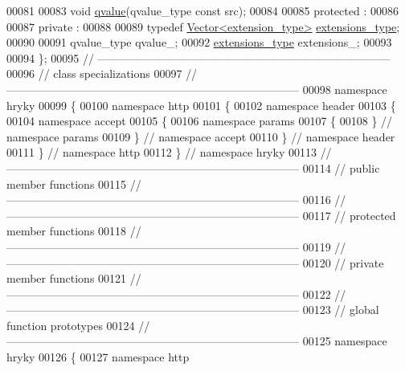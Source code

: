 \begin{DoxyCode}
00081 
00083     \textcolor{keywordtype}{void} \hyperlink{classhryky_1_1http_1_1header_1_1accept_1_1params_1_1_entity_a01141a7fae976c8a5ed5de55eb5d7349}{qvalue}(qvalue\_type \textcolor{keyword}{const} src);
00084 
00085 \textcolor{keyword}{protected} :
00086 
00087 \textcolor{keyword}{private} :
00088 
00089     \textcolor{keyword}{typedef} \hyperlink{classhryky_1_1_vector}{Vector<extension_type>} \hyperlink{classhryky_1_1_vector}{extensions_type};
00090 
00091     qvalue\_type qvalue\_;
00092     \hyperlink{classhryky_1_1_vector}{extensions_type} extensions\_;
00093 
00094 \};
00095 \textcolor{comment}{//
      ------------------------------------------------------------------------------}
00096 \textcolor{comment}{// class specializations}
00097 \textcolor{comment}{//
      ------------------------------------------------------------------------------}
00098 \textcolor{keyword}{namespace }hryky
00099 \{
00100 \textcolor{keyword}{namespace }http
00101 \{
00102 \textcolor{keyword}{namespace }header
00103 \{
00104 \textcolor{keyword}{namespace }accept
00105 \{
00106 \textcolor{keyword}{namespace }params
00107 \{
00108 \} \textcolor{comment}{// namespace params}
00109 \} \textcolor{comment}{// namespace accept}
00110 \} \textcolor{comment}{// namespace header}
00111 \} \textcolor{comment}{// namespace http}
00112 \} \textcolor{comment}{// namespace hryky}
00113 \textcolor{comment}{//
      ------------------------------------------------------------------------------}
00114 \textcolor{comment}{// public member functions}
00115 \textcolor{comment}{//
      ------------------------------------------------------------------------------}
00116 \textcolor{comment}{//
      ------------------------------------------------------------------------------}
00117 \textcolor{comment}{// protected member functions}
00118 \textcolor{comment}{//
      ------------------------------------------------------------------------------}
00119 \textcolor{comment}{//
      ------------------------------------------------------------------------------}
00120 \textcolor{comment}{// private member functions}
00121 \textcolor{comment}{//
      ------------------------------------------------------------------------------}
00122 \textcolor{comment}{//
      ------------------------------------------------------------------------------}
00123 \textcolor{comment}{// global function prototypes}
00124 \textcolor{comment}{//
      ------------------------------------------------------------------------------}
00125 \textcolor{keyword}{namespace }hryky
00126 \{
00127 \textcolor{keyword}{namespace }http

\end{DoxyCode}
